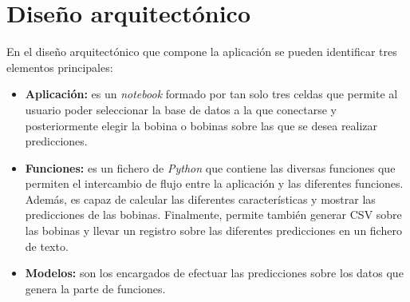 \section{Diseño arquitectónico}
En el diseño arquitectónico que compone la aplicación se pueden identificar tres elementos principales:
\begin{itemize}
    \item \textbf{Aplicación:} es un \emph{notebook} formado por tan solo tres celdas que permite al usuario poder seleccionar la base de datos a la que conectarse y posteriormente elegir la bobina o bobinas sobre las que se desea realizar predicciones.
    \item \textbf{Funciones:} es un fichero de \emph{Python} que contiene las diversas funciones que permiten el intercambio de flujo entre la aplicación y las diferentes funciones. Además, es capaz de calcular las diferentes características y mostrar las predicciones de las bobinas. Finalmente, permite también generar CSV sobre las bobinas y llevar un registro sobre las diferentes predicciones en un fichero de texto.
    \item \textbf{Modelos:} son los encargados de efectuar las predicciones sobre los datos que genera la parte de funciones.
\end{itemize}

